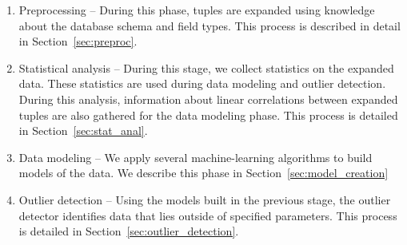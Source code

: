 \begin{enumerate}
	\item Preprocessing -- During this phase, tuples are expanded using knowledge about the database schema and field types. This process is described in detail in Section~\ref{sec:preproc}.

	\item Statistical analysis -- During this stage, we collect statistics on the expanded data. These statistics are used during data modeling and outlier detection. During this analysis, information about linear correlations between expanded tuples are also gathered for the data modeling phase. This process is detailed in Section~\ref{sec:stat_anal}.
 
	\item Data modeling -- We apply several machine-learning algorithms to build models of the data. We describe this phase in Section~\ref{sec:model_creation}

	\item Outlier detection -- Using the models built in the previous stage, the outlier detector identifies data that lies outside of specified parameters. This process is detailed in Section~\ref{sec:outlier_detection}.
\end{enumerate}

